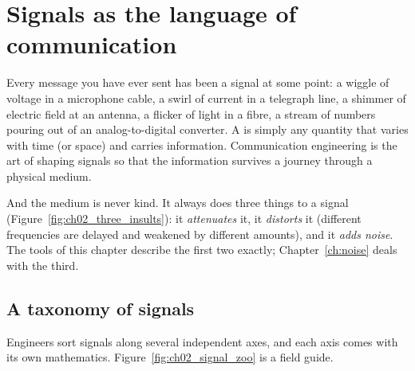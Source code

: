 \section{Signals as the language of communication}
\label{sec:ch02:signals}

Every message you have ever sent has been a signal at some point: a wiggle of voltage in a
microphone cable, a swirl of current in a telegraph line, a shimmer of electric field at an
antenna, a flicker of light in a fibre, a stream of numbers pouring out of an analog-to-digital
converter. A  is simply any quantity that varies with time (or space) and carries
information. Communication engineering is the art of shaping signals so that the information
survives a journey through a physical medium.

And the medium is never kind. It always does three things to a signal
(Figure~\ref{fig:ch02_three_insults}): it \emph{attenuates} it, it \emph{distorts} it (different
frequencies are delayed and weakened by different amounts), and it \emph{adds noise}. The tools of
this chapter describe the first two exactly; Chapter~\ref{ch:noise} deals with the third.


\subsection{A taxonomy of signals}

Engineers sort signals along several independent axes, and each axis comes with its own
mathematics. Figure~\ref{fig:ch02_signal_zoo} is a field guide.


